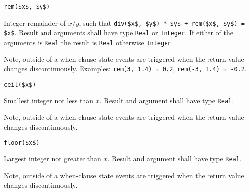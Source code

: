 \begin{operatordefinition}[rem]
\begin{synopsis}\begin{lstlisting}
rem($x$, $y$)
\end{lstlisting}\end{synopsis}
\begin{semantics}
Integer remainder of $x / y$, such that \lstinline!div($x$, $y$) * $y$ + rem($x$, $y$) = $x$!.  Result and arguments shall have type \lstinline!Real! or \lstinline!Integer!.  If either of the arguments is \lstinline!Real! the result is \lstinline!Real! otherwise \lstinline!Integer!.
\begin{nonnormative}
Note, outside of a when-clause state events are triggered when the return value changes discontinuously.  Examples: \lstinline!rem(3, 1.4) = 0.2!, \lstinline!rem(-3, 1.4) = -0.2!.
\end{nonnormative}
\end{semantics}
\end{operatordefinition}

\begin{operatordefinition}[ceil]
\begin{synopsis}\begin{lstlisting}
ceil($x$)
\end{lstlisting}\end{synopsis}
\begin{semantics}
Smallest integer not less than $x$.  Result and argument shall have type \lstinline!Real!.
\begin{nonnormative}
Note, outside of a when-clause state events are triggered when the return value changes discontinuously.
\end{nonnormative}
\end{semantics}
\end{operatordefinition}

\begin{operatordefinition}[floor]
\begin{synopsis}\begin{lstlisting}
floor($x$)
\end{lstlisting}\end{synopsis}
\begin{semantics}
Largest integer not greater than $x$.  Result and argument shall have type \lstinline!Real!.
\begin{nonnormative}
Note, outside of a when-clause state events are triggered when the return value changes discontinuously.
\end{nonnormative}
\end{semantics}
\end{operatordefinition}

